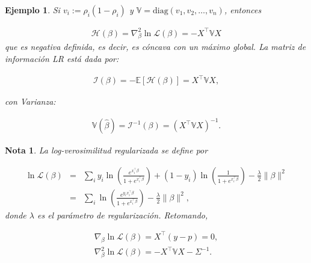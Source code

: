 \documentclass[12pt]{article}
\newtheorem{Note}{Nota}%
\newtheorem{Ejem}{Ejemplo}%
\begin{document}
\begin{Ejem}
Si $v_i := \rho_i (1 - \rho_i)$ y $\mathbb{V} = \mathrm{diag}(v_1, v_2, \dots, v_n)$, entonces

\begin{eqnarray*}
\mathcal{H}(\beta) = \nabla^2_\beta \ln \mathcal{L}(\beta) = -X^\top \mathbb{V} X
\end{eqnarray*}
que es negativa definida, es decir, es cóncava con un máximo global. La matriz de información \textit{LR} está dada por:

\begin{eqnarray*}
\mathcal{I}(\beta) = -\mathbb{E}[\mathcal{H}(\beta)] = X^\top \mathbb{V} X,
\end{eqnarray*}

con Varianza:

\begin{eqnarray*}
\mathbb{V}(\hat{\beta}) = \mathcal{I}^{-1}(\beta) = (X^\top \mathbb{V} X)^{-1}.
\end{eqnarray*}
\end{Ejem}


\begin{Note}
La \textit{log-verosimilitud regularizada} se define por

\begin{eqnarray*}
\ln \mathcal{L}(\beta) &=& \sum_i y_i \ln \left( \frac{e^{x_i^\top \beta}}{1 + e^{x_i^\top \beta}} \right) + (1 - y_i) \ln \left( \frac{1}{1 + e^{x_i^\top \beta}} \right)
- \frac{\lambda}{2} \| \beta \|^2\\
&=& \sum_i \ln \left( \frac{e^{y_i x_i^\top \beta}}{1 + e^{x_i^\top \beta}} \right) - \frac{\lambda}{2} \| \beta \|^2,
\end{eqnarray*}
donde $\lambda$  es el \textit{parámetro de regularización}. Retomando,

\begin{eqnarray*}
\nabla_\beta \ln \mathcal{L}(\beta) = X^\top (y - p) = 0,\\
\nabla_\beta^2 \ln \mathcal{L}(\beta) = -X^\top \mathbb{V} X - \Sigma^{-1}.
\end{eqnarray*}
\end{Note}
\end{document}
